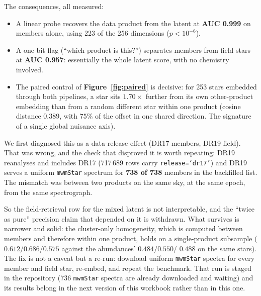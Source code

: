 The consequences, all measured:

\begin{itemize}
\item A linear probe recovers the data product from the latent at
  \textbf{AUC 0.999} on members alone, using 223 of the 256 dimensions
  ($p < 10^{-6}$).
\item A one-bit flag (``which product is this?'') separates members from field
stars at \textbf{AUC 0.957}: essentially the whole latent score, with no
chemistry involved.
\item The paired control of \textbf{Figure~\ref{fig:paired}} is decisive: for
253 stars embedded through both pipelines, a star sits $1.70\times$ further
from its own other-product embedding than from a random different star within
one product (cosine distance $0.389$, with $75\%$ of the offset in one shared
direction. The signature of a single global nuisance axis).
\end{itemize}

We first diagnosed this as a data-release effect (DR17 members, DR19 field).
That was wrong, and the check that disproved it is worth repeating: DR19
reanalyses and includes DR17 (717\,689 rows carry \texttt{release=`dr17'}) and
DR19 serves a uniform \texttt{mwmStar} spectrum for \textbf{738 of 738} members
in the backfilled list. The mismatch was between two products on the same sky,
at the same epoch, from the same spectrograph.

So the field-retrieval row for the mixed latent is not interpretable, and the
``twice as pure'' precision claim that depended on it is withdrawn. What
survives is narrower and solid: the cluster-only homogeneity, which is computed
between members and therefore within one product, holds on a single-product
subsample ($0.612$/$0.686$/$0.575$ against the abundances' $0.484$/$0.550$/
$0.488$ on the same stars). The fix is not a caveat but a re-run: download
uniform \texttt{mwmStar} spectra for every member and field star, re-embed, and
repeat the benchmark. That run is staged in the repository (736
\texttt{mwmStar} spectra are already downloaded and waiting) and its results
belong in the next version of this workbook rather than in this one.

